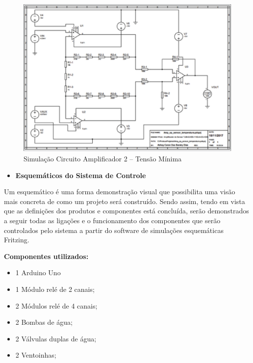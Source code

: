 \begin{figure}[!htb]                  
	\centering                          
	\includegraphics[scale=0.45]{figuras/circ3.eps}
	\caption{ Simulação Circuito Amplificador 2 – Tensão Mínima }   \label{figamp22}              
\end{figure}


\begin{itemize}
    \item \textbf{Esquemáticos do Sistema de Controle}
\end{itemize}
Um esquemático é uma forma demonstração visual que possibilita uma visão mais concreta de como um projeto será construído. Sendo assim, tendo em vista que as definições dos produtos e componentes está concluída, serão demonstrados a seguir todas as ligações e o funcionamento dos componentes que serão controlados pelo sistema a partir do software de simulações esquemáticas Fritzing.

\textbf{Componentes utilizados:}
\begin{itemize}
    \item 1 Arduino Uno
    \item 1 Módulo relé de 2 canais;
    \item 2 Módulos relé de 4 canais;
    \item 2 Bombas de água;
    \item 2 Válvulas duplas de água;
    \item 2 Ventoinhas;
    
\end{itemize}

